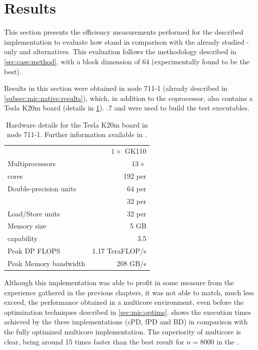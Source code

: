 \documentclass[../thesis]{subfiles}
\begin{document}
	\section{Results}
	\label{sec:cuda:results}

	This section presents the efficiency measurements performed for the described \cuda implementation to evaluate how \gpus stand in comparison with the already studied \cpu-only and \intel\xeonphi alternatives. This evaluation follows the methodology described in \cref{sec:case:method}, with a block dimension of 64 (experimentally found to be the best).

	Results in this section were obtained in \search node 711-1 (already described in \cref{subsec:mic:native:results}), which, in addition to the \intel\xeonphi coprocessor, also contains a \nvidia Tesla K20m board (details in \cref{tab:k20m}). .7 and  were used to build the test executables.

	\begin{table}
		\centering
		\begin{tabular}{lr}
			\hline
			\gpus & $1\times$ GK110 \\
			Multiprocessors & $13\times$ \smx \\
			\cuda cores & 192 per \smx \\
			Double-precision units & 64 per \smx \\
			\sfus & 32 per \smx \\
			Load/Store units & 32 per \smx \\
			Memory size & 5 GB \\
			\cuda capability & 3.5 \\
			\hline
			Peak DP FLOPS & 1.17 TeraFLOP/s \\
			Peak Memory bandwidth & 208 GB/s \\
			\hline
		\end{tabular}
		\caption{Hardware details for the \nvidia Tesla K20m board in \search node 711-1. Further information available in \cite{NVIDIA:KEPLER,NVIDIA:TeslaKSeriesOverview}.}
		\label{tab:k20m}
	\end{table}

	Although this implementation was able to profit in some measure from the experience gathered in the previous chapters, it was not able to match, much less exceed, the performance obtained in a multicore environment, even before the optimization techniques described in \cref{sec:mic:optims}.  shows the execution times achieved by the three \cuda implementations (cPD, fPD and BD) in comparison with the fully optimized multicore implementation. The superiority of multicore is clear, being around 15 times faster than the best result for $n=8000$ in the \gpu.
\end{document}
